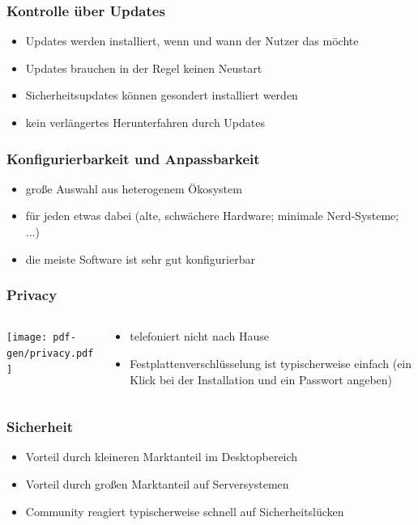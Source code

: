 \documentclass[t]{beamer}
\begin{document}
\begin{frame}
  \frametitle{Kontrolle über Updates}
  \begin{itemize}
  \item Updates werden installiert, wenn und wann der Nutzer das möchte
  \item Updates brauchen in der Regel keinen Neustart
  \item Sicherheitsupdates können gesondert installiert werden
  \item kein verlängertes Herunterfahren durch Updates
  \end{itemize}
\end{frame}

\begin{frame}
  \frametitle{Konfigurierbarkeit und Anpassbarkeit}
  \begin{itemize}
  \item große Auswahl aus heterogenem Ökosystem
  \item für jeden etwas dabei (alte, schwächere Hardware; minimale
    Nerd-Systeme; ...)
  \item die meiste Software ist sehr gut konfigurierbar
  \end{itemize}
\end{frame}

\begin{frame}
  \frametitle{Privacy}
  \begin{columns}
    \begin{column}[T]{0.45\textwidth}
      \texttt{[image: pdf-gen/privacy.pdf]}
    \end{column}
    \begin{column}{0.45\textwidth}
      \begin{itemize}
      \item telefoniert nicht nach Hause
      \item Festplattenverschlüsselung ist typischerweise einfach (ein
        Klick bei der Installation und ein Passwort angeben)
      \end{itemize}
    \end{column}
  \end{columns}
\end{frame}

\begin{frame}
  \frametitle{Sicherheit}
  \begin{itemize}
  \item Vorteil durch kleineren Marktanteil im Desktopbereich
  \item Vorteil durch großen Marktanteil auf Serversystemen
  \item Community reagiert typischerweise schnell auf
    Sicherheitslücken
  \end{itemize}
\end{frame}
\end{document}
